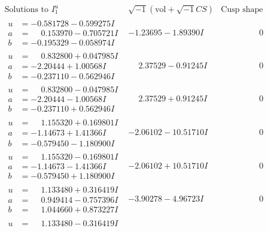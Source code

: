 \documentclass[1p]{elsarticle_modified}
\theoremstyle{definition}
\newcommand{\I}{\sqrt{-1}}
\begin{document}
$$\begin{array}{c|c|c}
\text{Solutions to }I^u_{1}& \I (\text{vol} + \sqrt{-1}CS) & \text{Cusp shape}\\
 \hline 
\begin{aligned}
u &= -0.581728 - 0.599275 I \\
a &= \phantom{-}0.153970 - 0.705721 I \\
b &= -0.195329 - 0.058974 I\end{aligned}
 & -1.23695 - 1.89390 I & \phantom{-0.000000 } 0 \\ \hline\begin{aligned}
u &= \phantom{-}0.832800 + 0.047985 I \\
a &= -2.20444 + 1.00568 I \\
b &= -0.237110 - 0.562946 I\end{aligned}
 & \phantom{-}2.37529 - 0.91245 I & \phantom{-0.000000 } 0 \\ \hline\begin{aligned}
u &= \phantom{-}0.832800 - 0.047985 I \\
a &= -2.20444 - 1.00568 I \\
b &= -0.237110 + 0.562946 I\end{aligned}
 & \phantom{-}2.37529 + 0.91245 I & \phantom{-0.000000 } 0 \\ \hline\begin{aligned}
u &= \phantom{-}1.155320 + 0.169801 I \\
a &= -1.14673 + 1.41366 I \\
b &= -0.579450 - 1.180900 I\end{aligned}
 & -2.06102 - 10.51710 I & \phantom{-0.000000 } 0 \\ \hline\begin{aligned}
u &= \phantom{-}1.155320 - 0.169801 I \\
a &= -1.14673 - 1.41366 I \\
b &= -0.579450 + 1.180900 I\end{aligned}
 & -2.06102 + 10.51710 I & \phantom{-0.000000 } 0 \\ \hline\begin{aligned}
u &= \phantom{-}1.133480 + 0.316419 I \\
a &= \phantom{-}0.949414 - 0.757396 I \\
b &= \phantom{-}1.044660 + 0.873227 I\end{aligned}
 & -3.90278 - 4.96723 I & \phantom{-0.000000 } 0 \\ \hline\begin{aligned}
u &= \phantom{-}1.133480 - 0.316419 I \\

\end{aligned}
\end{array}$$
\end{document}
